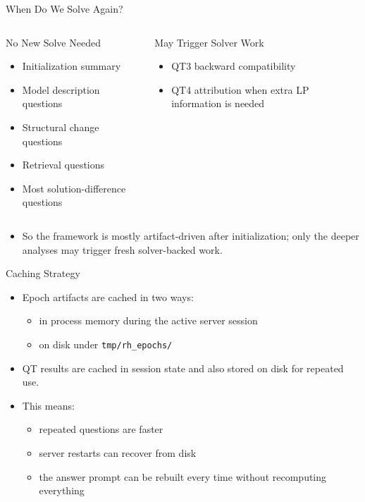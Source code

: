\documentclass[10pt]{beamer}
\newcommand{\goodbox}[2]{
  \begin{block}{#1}
  #2
  \end{block}
}
\newcommand{\func}[1]{\texttt{#1}}
\begin{document}
\begin{frame}{When Do We Solve Again?}
  \begin{columns}[T]
    \goodbox{No New Solve Needed}{
      \begin{itemize}
        \item Initialization summary
        \item Model description questions
        \item Structural change questions
        \item Retrieval questions
        \item Most solution-difference questions
      \end{itemize}
    }
    \goodbox{May Trigger Solver Work}{
      \begin{itemize}
        \item QT3 backward compatibility
        \item QT4 attribution when extra LP information is needed
      \end{itemize}
    }
  \end{columns}
  \vspace{0.5em}
  \begin{itemize}
    \item So the framework is mostly artifact-driven after initialization; only the deeper analyses may trigger fresh solver-backed work.
  \end{itemize}
\end{frame}

\begin{frame}{Caching Strategy}
  \begin{itemize}
    \item Epoch artifacts are cached in two ways:
    \begin{itemize}
      \item in process memory during the active server session
      \item on disk under \func{tmp/rh\_epochs/}
    \end{itemize}
    \item QT results are cached in session state and also stored on disk for repeated use.
    \item This means:
    \begin{itemize}
      \item repeated questions are faster
      \item server restarts can recover from disk
      \item the answer prompt can be rebuilt every time without recomputing everything
    \end{itemize}
  \end{itemize}
\end{frame}
\end{document}
